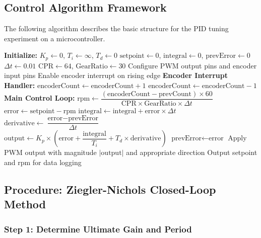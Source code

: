 \subsection{Control Algorithm Framework}

The following algorithm describes the basic structure for the PID tuning experiment on a microcontroller.

\begin{algorithm}
\caption{Motor Speed PID Control Loop}
\label{alg:motor_pid}
\begin{algorithmic}[1]
\State \textbf{Initialize:}
\State \quad $K_p \gets 0$, $T_i \gets \infty$, $T_d \gets 0$ 
\State \quad $\text{setpoint} \gets 0$, $\text{integral} \gets 0$, $\text{prevError} \gets 0$
\State \quad $\Delta t \gets 0.01$ 
\State \quad $\text{CPR} \gets 64$, $\text{GearRatio} \gets 30$ 
\State Configure PWM output pins and encoder input pins
\State Enable encoder interrupt on rising edge
\State
\State \textbf{Encoder Interrupt Handler:}
    \State $\text{encoderCount} \gets \text{encoderCount} + 1$
\Else
    \State $\text{encoderCount} \gets \text{encoderCount} - 1$
\EndIf
\State
\State \textbf{Main Control Loop:}
        \State $\text{rpm} \gets \dfrac{(\text{encoderCount} - \text{prevCount}) \times 60}{\text{CPR} \times \text{GearRatio} \times \Delta t}$
        \State $\text{error} \gets \text{setpoint} - \text{rpm}$
        \State $\text{integral} \gets \text{integral} + \text{error} \times \Delta t$
        \State $\text{derivative} \gets \dfrac{\text{error} - \text{prevError}}{\Delta t}$
        \State $\text{output} \gets K_p \times \left(\text{error} + \dfrac{\text{integral}}{T_i} + T_d \times \text{derivative}\right)$
        \State $\text{prevError} \gets \text{error}$
        \State Apply PWM output with magnitude $|\text{output}|$ and appropriate direction
        \State Output setpoint and rpm for data logging
    \EndIf
\EndWhile
\end{algorithmic}
\end{algorithm}

\subsection{Procedure: Ziegler-Nichols Closed-Loop Method}

\subsubsection{Step 1: Determine Ultimate Gain and Period}

